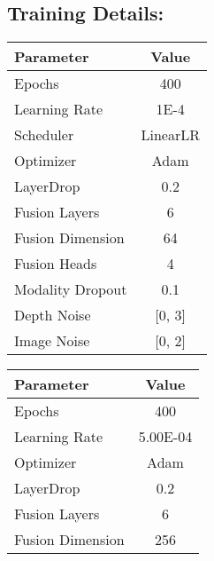 \subsection{Training Details: }\label{sec_appendix_training}


\begin{table*}[h]
\centering
\label{tab:training_configs}
\begin{minipage}[t]{0.33\linewidth}
\centering
\begin{tabular}{lc}
\toprule
\textbf{Parameter}      & \textbf{Value} \\ 
\midrule
Epochs                  & 400            \\
Learning Rate           & 1E-4       \\
Scheduler               & LinearLR  \\
Optimizer               & Adam           \\
LayerDrop               & 0.2            \\
Fusion Layers           & 6              \\
Fusion Dimension        & 64            \\
Fusion Heads            & 4              \\
Modality Dropout        & 0.1            \\
Depth Noise             & [0, 3]      \\
Image Noise             & [0, 2]         \\
\bottomrule
\end{tabular}
\caption{\textbf{MM-Fi Finetuning}}
\label{tab:mmfi_details}
\end{minipage}%
\hfill
\begin{minipage}[t]{0.33\linewidth}
\centering
\begin{tabular}{lc}
\toprule
\textbf{Parameter}      & \textbf{Value} \\ 
\midrule
Epochs                  & 400            \\
Learning Rate           & 5.00E-04       \\
Optimizer               & Adam           \\
LayerDrop               & 0.2            \\
Fusion Layers           & 6              \\
Fusion Dimension        & 256            \\

\end{tabular}
\end{minipage}
\end{table*}
